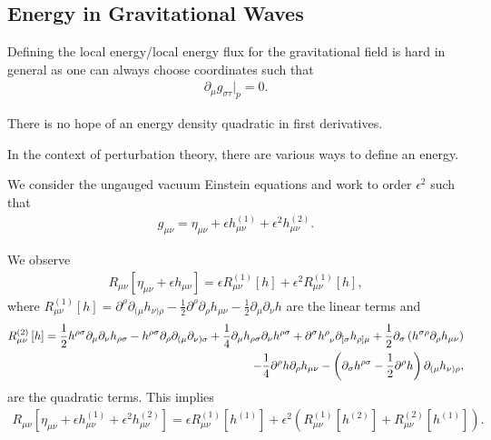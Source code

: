 
\subsection{Energy in Gravitational Waves}

Defining the local energy/local energy flux for the gravitational field is hard in general as one can always choose coordinates such that
\begin{align}
    \partial_\mu g_{\sigma \tau} \bigg|_{p} = 0
.\end{align}

There is no hope of an energy density quadratic in first derivatives.

In the context of perturbation theory, there are various ways to define an energy.

We consider the ungauged vacuum Einstein equations and work to order $\epsilon^2$ such that
\begin{align}
    g_{\mu \nu} = \eta_{\mu \nu} + \epsilon h^{\left( 1 \right) }_{\mu \nu} + \epsilon^2 h^{\left( 2 \right) }_{\mu \nu}
.\end{align}

We observe
\begin{align}
    R_{\mu \nu} \left[ \eta_{\mu \nu} + \epsilon h_{\mu \nu} \right]  = \epsilon R^{\left( 1 \right) }_{\mu \nu}\left[ h \right] + \epsilon^2 R^{\left( 1 \right) }_{\mu \nu} \left[ h \right] 
,\end{align}
where $R^{\left( 1 \right) }_{\mu \nu} \left[ h \right] = \partial^{\rho} \partial_{(\mu} h_{\nu)\rho} - \frac{1}{2} \partial^{\rho} \partial_\rho h_{\mu \nu} - \frac{1}{2} \partial_\mu \partial_\nu h$ are the linear terms and
\begin{align}
    R^{\left( 2 \right) }_{\mu \nu}\left[ h \right] = \frac{1}{2} h^{\rho \sigma} \partial_\mu \partial_\nu h_{\rho \sigma} - h^{\rho \sigma} \partial_\rho \partial_{(\mu} \partial_{\nu) \sigma} + \frac{1}{4} \partial_\mu h_{\rho \sigma} \partial_\nu h^{\rho \sigma} + \partial^{\sigma} \tensor{h}{^{\rho}_\nu} \partial_{[\sigma} h_{\rho] \mu} + \frac{1}{2} \partial_\sigma \left( h^{\sigma \rho} \partial_\rho h_{\mu \nu} \right) \nonumber \\
    - \frac{1}{4} \partial^{\rho} h \partial_\rho h_{\mu \nu} - \left( \partial_\sigma h^{\rho \sigma} - \frac{1}{2} \partial^{\rho} h \right) \partial_{(\mu} h_{\nu)\rho}
,\end{align}
are the quadratic terms. This implies
\begin{align}
    R_{\mu \nu} \left[ \eta_{\mu \nu} + \epsilon h^{\left( 1 \right) }_{\mu \nu} + \epsilon^2 h^{\left( 2 \right) }_{\mu \nu} \right]  = \epsilon R^{\left( 1 \right) }_{\mu \nu}\left[ h^{\left( 1 \right) } \right]  + \epsilon^2 \left( R^{\left( 1 \right) }_{\mu \nu} \left[ h^{\left( 2 \right) } \right] + R^{\left( 2 \right) }_{\mu \nu} \left[ h^{\left( 1 \right) } \right]  \right) 
.\end{align} 

